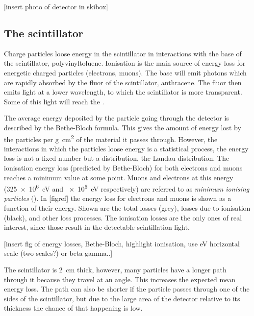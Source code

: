 [insert photo of detector in skibox]


\subsection{The scintillator}

Charge particles loose energy in the scintillator in interactions with the base of the scintillator, polyvinyltoluene. Ionisation is the main source of energy loss for energetic charged particles (electrons, muons). The base will emit photons which are rapidly absorbed by the fluor of the scintillator, anthracene. The fluor then emits light at a lower wavelength, to which the scintillator is more transparent. Some of this light will reach the \pmt.

The average energy deposited by the particle going through the detector is described by the Bethe-Bloch formula. This gives the amount of energy lost by the particles per \si{\gram\centi\meter\squared} of the material it passes through. However, the interactions in which the particles loose energy is a statistical process, the energy loss is not a fixed number but a distribution, the Landau distribution. The ionisation energy loss (predicted by Bethe-Bloch) for both electrons and muons reaches a minimum value at some point. Muons and electrons at this energy (\SI{325e6}{\eV} and \SI{e6}{\eV} respectively) are referred to as \textit{minimum ionising particles} (\mip). In [figref] the energy loss for electrons and muons is shown as a function of their energy. Shown are the total losses (grey), losses due to ionisation (black), and other loss processes. The ionisation losses are the only ones of real interest, since those result in the detectable scintillation light.

[insert fig of energy losses, Bethe-Bloch, highlight ionisation, use eV horizontal scale (two scales?) or beta gamma..]

The scintillator is \SI{2}{\centi\meter} thick, however, many particles have a longer path through it because they travel at an angle. This increases the expected mean energy loss. The path can also be shorter if the particle passes through one of the sides of the scintillator, but due to the large area of the detector relative to its thickness the chance of that happening is low.

